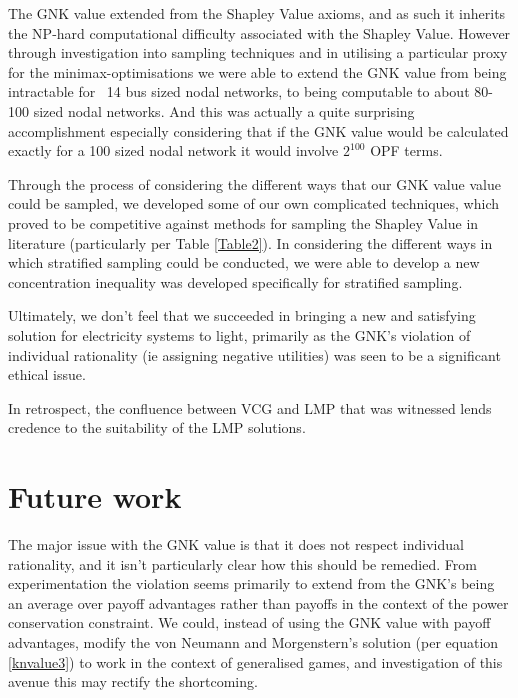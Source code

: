 The GNK value extended from the Shapley Value axioms, and as such it inherits the NP-hard computational difficulty associated with the Shapley Value.
However through investigation into sampling techniques and in utilising a particular proxy for the minimax-optimisations we were able to extend the GNK value from being intractable for ~14 bus sized nodal networks, to being computable to about 80-100 sized nodal networks.
And this was actually a quite surprising accomplishment especially considering that if the GNK value would be calculated exactly for a 100 sized nodal network it would involve $2^{100}$ OPF terms.

Through the process of considering the different ways that our GNK value value could be sampled, we developed some of our own complicated techniques, which proved to be competitive against methods for sampling the Shapley Value in literature (particularly per Table \ref{Table2}).
In considering the different ways in which stratified sampling could be conducted, we were able to develop a new concentration inequality was developed specifically for stratified sampling.

Ultimately, we don't feel that we succeeded in bringing a new and satisfying solution for electricity systems to light, primarily as the GNK's violation of individual rationality (ie assigning negative utilities) was seen to be a significant ethical issue.

In retrospect, the confluence between VCG and LMP that was witnessed lends credence to the suitability of the LMP solutions.


\section{Future work}
\label{sec:future}

The major issue with the GNK value is that it does not respect individual rationality, and it isn't particularly clear how this should be remedied.
From experimentation the violation seems primarily to extend from the GNK's being an average over payoff advantages rather than payoffs in the context of the power conservation constraint.
We could, instead of using the GNK value with payoff advantages, modify the von Neumann and Morgenstern's solution (per equation \ref{knvalue3}) to work in the context of generalised games, and investigation of this avenue this may rectify the shortcoming.

